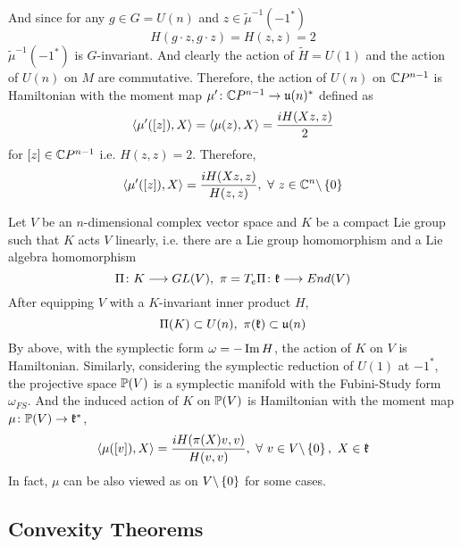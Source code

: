 \documentclass[a4paper,12pt]{article}
\begin{document}
	And since for any $g \in G = U(n)$ and $z \in \tilde{\mu}^{-1}(-1^*)$
	\begin{equation*}
		H(g \cdot z,g \cdot z) = H(z,z) = 2
	\end{equation*}
	$\tilde{\mu}^{-1}(-1^*)$ is $G$-invariant. And clearly the action of $\tilde{H} = U(1)$ and the action of $U(n)$ on $M$ are commutative. Therefore, the action of $U(n)$ on $\mathbb{C} P^{n-1}$ is Hamiltonian with the moment map $\mu^{\prime}  \colon \mathbb{C} P^{n-1} \rightarrow \mathfrak{u}(n)^*$ defined as
	\begin{equation*}
		\left\langle \mu^{\prime}([z]),X \right\rangle = \left\langle \mu(z),X \right\rangle = \frac{iH(Xz,z)}{2}
	\end{equation*}
	for $[z] \in \mathbb{C} P^{n-1}$ i.e. $H(z,z) = 2$. Therefore,
	\begin{equation*}
		\left\langle \mu^{\prime}([z]),X \right\rangle = \frac{iH(Xz,z)}{H(z,z)},~\forall~ z \in \mathbb{C}^n \backslash \left\{0\right\}
	\end{equation*}
	\begin{rem}
		Let $V$ be an $n$-dimensional complex vector space and $K$ be a compact Lie group such that $K$ acts $V$ linearly, i.e. there are a Lie group homomorphism and a Lie algebra homomorphism
		\begin{equation*}
			\Pi \colon K \longrightarrow GL(V),~\pi = T_e\Pi \colon  \mathfrak{k} \longrightarrow End(V)
		\end{equation*}
		After equipping $V$ with a $K$-invariant inner product $H$, 
		\begin{equation*}
			\Pi(K) \subset U(n),~ \pi(\mathfrak{k}) \subset \mathfrak{u}(n)
		\end{equation*}
		By above, with the symplectic form $\omega = -\operatorname{Im} H$, the action of $K$ on $V$ is Hamiltonian. Similarly, considering the symplectic reduction of $U(1)$ at $-1^*$, the projective space $\mathbb{P}(V)$ is a symplectic manifold with the Fubini-Study form  $\omega_{FS}$. And the induced action of $K$ on $\mathbb{P}(V)$ is Hamiltonian with the moment map $\mu \colon \mathbb{P}(V) \rightarrow \mathfrak{k}^*$,
		\begin{equation*}
			\left\langle \mu([v]),X \right\rangle = \frac{iH(\pi(X)v,v)}{H(v,v)},~\forall~v \in V \backslash \left\{0\right\},~X\in \mathfrak{k}
		\end{equation*}
		In fact, $\mu$ can be also viewed as on $V \backslash \left\{0\right\}$ for some cases.
	\end{rem}

	\subsection{Convexity Theorems}
\end{document}
